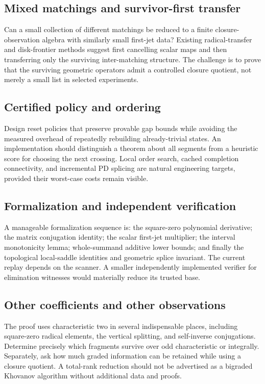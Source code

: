 \documentclass[11pt]{article}
\theoremstyle{definition}\newtheorem{definition}[theorem]{Definition}\newtheorem{example}[theorem]{Example}
\theoremstyle{remark}\newtheorem{remark}[theorem]{Remark}
\begin{document}
\subsection{Mixed matchings and survivor-first transfer}
Can a small collection of different matchings be reduced to a finite closure-observation algebra with similarly small first-jet data? Existing radical-transfer and disk-frontier methods suggest first cancelling scalar maps and then transferring only the surviving inter-matching structure. The challenge is to prove that the surviving geometric operators admit a controlled closure quotient, not merely a small list in selected experiments.

\subsection{Certified policy and ordering}
Design reset policies that preserve provable gap bounds while avoiding the measured overhead of repeatedly rebuilding already-trivial states. An implementation should distinguish a theorem about all segments from a heuristic score for choosing the next crossing. Local order search, cached completion connectivity, and incremental PD splicing are natural engineering targets, provided their worst-case costs remain visible.

\subsection{Formalization and independent verification}
A manageable formalization sequence is: the square-zero polynomial derivative; the matrix conjugation identity; the scalar first-jet multiplier; the interval monotonicity lemma; whole-summand additive lower bounds; and finally the topological local-saddle identities and geometric splice invariant. The current replay depends on the scanner. A smaller independently implemented verifier for elimination witnesses would materially reduce its trusted base.

\subsection{Other coefficients and other observations}
The proof uses characteristic two in several indispensable places, including square-zero radical elements, the vertical splitting, and self-inverse conjugations. Determine precisely which fragments survive over odd characteristic or integrally. Separately, ask how much graded information can be retained while using a closure quotient. A total-rank reduction should not be advertised as a bigraded Khovanov algorithm without additional data and proofs.
\end{document}
